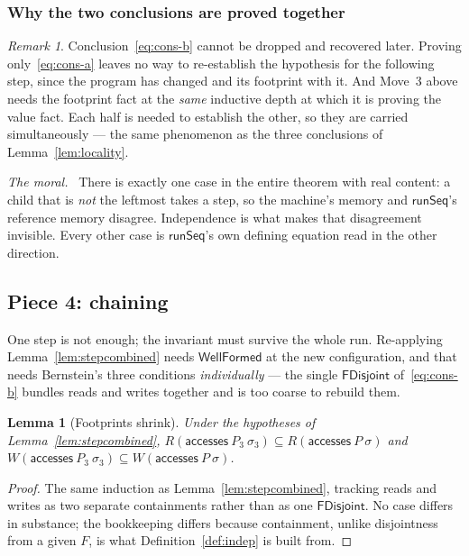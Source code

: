 \documentclass[11pt,a4paper]{article}
\theoremstyle{definition}
\theoremstyle{plain}
\newtheorem{lemma}[definition]{Lemma}
\theoremstyle{remark}
\newtheorem{remark}[definition]{Remark}
\newenvironment{moral}{\par\medskip\noindent\textit{The moral.}\ \ignorespaces}{\par\medskip}
\newcommand{\st}{\sigma}
\newcommand{\reads}[1]{R(#1)}
\newcommand{\writes}[1]{W(#1)}
\newcommand{\acc}{\mathsf{accesses}}
\newcommand{\runSeq}{\mathsf{runSeq}}
\newcommand{\wf}{\mathsf{WellFormed}}
\begin{document}
\subsubsection{Why the two conclusions are proved together}\label{sec:canonical:conserve-why}

\begin{remark}\label{rem:combined}
Conclusion~\eqref{eq:cons-b} cannot be dropped and recovered later. Proving
only~\eqref{eq:cons-a} leaves no way to re-establish the hypothesis for the following step,
since the program has changed and its footprint with it. And Move~3 above needs the
footprint fact at the \emph{same} inductive depth at which it is proving the value fact. Each
half is needed to establish the other, so they are carried simultaneously --- the same
phenomenon as the three conclusions of Lemma~\ref{lem:locality}.
\end{remark}

\begin{moral}
There is exactly one case in the entire theorem with real content: a child that is \emph{not}
the leftmost takes a step, so the machine's memory and $\runSeq$'s reference memory disagree.
Independence is what makes that disagreement invisible. Every other case is $\runSeq$'s own
defining equation read in the other direction.
\end{moral}

\subsection{Piece 4: chaining}

One step is not enough; the invariant must survive the whole run. Re-applying
Lemma~\ref{lem:stepcombined} needs $\wf$ at the new configuration, and that needs Bernstein's
three conditions \emph{individually} --- the single $\mathsf{FDisjoint}$
of~\eqref{eq:cons-b} bundles reads and writes together and is too coarse to rebuild them.

\begin{lemma}[Footprints shrink]\label{lem:subsetrw}
Under the hypotheses of Lemma~\ref{lem:stepcombined},
$\reads{\acc\ P_3\ \st_3} \subseteq \reads{\acc\ P\ \st}$ and
$\writes{\acc\ P_3\ \st_3} \subseteq \writes{\acc\ P\ \st}$.
\end{lemma}

\begin{proof}
The same induction as Lemma~\ref{lem:stepcombined}, tracking reads and writes as two separate
containments rather than as one $\mathsf{FDisjoint}$. No case differs in substance; the
bookkeeping differs because containment, unlike disjointness from a given $F$, is what
Definition~\ref{def:indep} is built from.
\end{proof}
\end{document}
